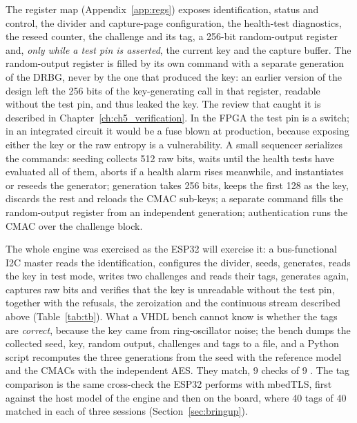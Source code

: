 The register map (Appendix~\ref{app:regs}) exposes identification,
status and control, the divider and capture-page configuration, the
health-test diagnostics, the reseed counter, the challenge and its tag,
a 256-bit random-output register and, \emph{only while a test pin is
asserted}, the current key and the capture buffer. The random-output
register is filled by its own command with a separate generation of the
DRBG, never by the one that produced the key: an earlier version of the
design left the 256 bits of the key-generating call in that register,
readable without the test pin, and thus leaked the key. The review that
caught it is described in Chapter~\ref{ch:ch5_verification}. In the FPGA the test
pin is a switch; in an integrated circuit it would be a fuse blown at
production, because exposing either the key or the raw entropy is a
vulnerability. A small sequencer serializes the commands: seeding
collects 512 raw bits, waits until the health tests have evaluated all
of them, aborts if a health alarm rises meanwhile, and instantiates or
reseeds the generator; generation takes 256 bits, keeps the first 128 as the key, discards the rest and reloads the CMAC
sub-keys; a separate command fills the random-output register from an
independent generation; authentication runs the CMAC over the challenge
block.

The whole engine was exercised as the ESP32 will exercise it: a
bus-functional \ac{I2C} master reads the identification, configures the
divider, seeds, generates, reads the key in test mode, writes two
challenges and reads their tags, generates again, captures raw bits and
verifies that the key is unreadable without the test pin, together with
the refusals, the zeroization and the continuous stream described above
(Table~\ref{tab:tb}). What a VHDL bench cannot know is whether the tags are
\emph{correct}, because the key came from ring-oscillator noise; the
bench dumps the collected seed, key, random output, challenges and tags
to a file, and a Python script recomputes the three generations from the
seed with the reference model and the CMACs with the independent AES.
They match, 9 checks of 9 \simu{}. The tag comparison is the same
cross-check the ESP32 performs with mbedTLS, first against the host
model of the engine and then on the board, where 40 tags of 40 matched
in each of three sessions \meas{} (Section~\ref{sec:bringup}).
